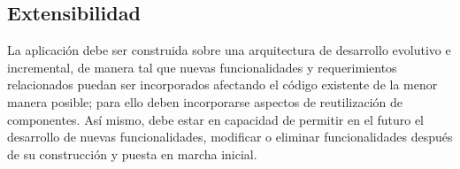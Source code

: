 \subsection{Extensibilidad}
La aplicaci\'on debe ser construida sobre una arquitectura de desarrollo evolutivo e incremental, de manera tal que nuevas funcionalidades y requerimientos relacionados puedan ser incorporados afectando el c\'odigo existente de la menor manera posible; para ello deben incorporarse aspectos de reutilizaci\'on de componentes. As\'i mismo, debe estar en capacidad de permitir en el futuro el desarrollo de nuevas funcionalidades, modificar o eliminar funcionalidades despu\'es de su construcci\'on y puesta en marcha inicial.
